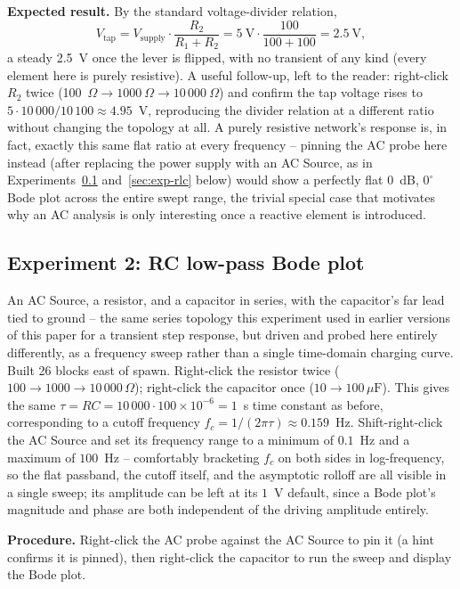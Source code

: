 \textbf{Expected result.} By the standard voltage-divider relation,
\begin{equation}
V_{\text{tap}} = V_{\text{supply}} \cdot \frac{R_2}{R_1 + R_2} = 5~\text{V} \cdot \frac{100}{100+100} = 2.5~\text{V},
\end{equation}
a steady 2.5~V once the lever is flipped, with no transient of any kind (every element here
is purely resistive). A useful follow-up, left to the reader: right-click $R_2$ twice
(100~$\Omega \to 1000~\Omega \to 10\,000~\Omega$) and confirm the tap voltage rises to
$5 \cdot 10\,000/10\,100 \approx 4.95$~V, reproducing the divider relation at a different
ratio without changing the topology at all. A purely resistive network's response is, in
fact, exactly this same flat ratio at every frequency -- pinning the AC probe here instead
(after replacing the power supply with an AC Source, as in Experiments~\ref{sec:exp-rc}
and~\ref{sec:exp-rlc} below) would show a perfectly flat 0~dB, $0^\circ$ Bode plot across the
entire swept range, the trivial special case that motivates why an AC analysis is only
interesting once a reactive element is introduced.

\subsection{Experiment 2: RC low-pass Bode plot}
\label{sec:exp-rc}

An AC Source, a resistor, and a capacitor in series, with the capacitor's far lead tied to
ground -- the same series topology this experiment used in earlier versions of this paper for
a transient step response, but driven and probed here entirely differently, as a frequency
sweep rather than a single time-domain charging curve. Built 26 blocks east of spawn.
Right-click the resistor twice ($100 \to 1000 \to 10\,000\,\Omega$); right-click the
capacitor once ($10 \to 100\,\mu\text{F}$). This gives the same
$\tau = RC = 10\,000 \cdot 100\times10^{-6} = 1$~s time constant as before, corresponding to a
cutoff frequency $f_c = 1/(2\pi\tau) \approx 0.159$~Hz. Shift-right-click the AC Source and
set its frequency range to a minimum of $0.1$~Hz and a maximum of $100$~Hz -- comfortably
bracketing $f_c$ on both sides in log-frequency, so the flat passband, the cutoff itself, and
the asymptotic rolloff are all visible in a single sweep; its amplitude can be left at its
$1$~V default, since a Bode plot's magnitude and phase are both independent of the driving
amplitude entirely.

\textbf{Procedure.} Right-click the AC probe against the AC Source to pin it (a hint
confirms it is pinned), then right-click the capacitor to run the sweep and display the Bode
plot.


